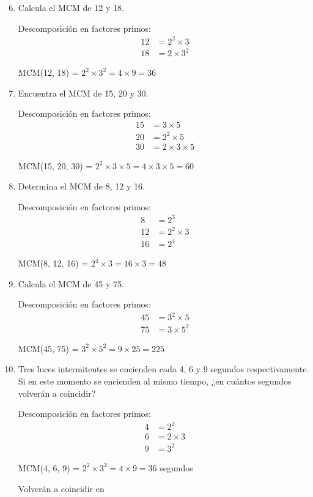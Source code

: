 \documentclass[12pt,a4paper]{article}
\begin{document}
\begin{enumerate}
    \setcounter{enumi}{5}
    \item Calcula el MCM de 12 y 18.

Descomposición en factores primos:
\begin{align*}
12 &= 2^2 \times 3 \\
18 &= 2 \times 3^2
\end{align*}

MCM(12, 18) = $2^2 \times 3^2 = 4 \times 9 = \boxed{36}$
    
    \item Encuentra el MCM de 15, 20 y 30.

Descomposición en factores primos:
\begin{align*}
15 &= 3 \times 5 \\
20 &= 2^2 \times 5 \\
30 &= 2 \times 3 \times 5
\end{align*}

MCM(15, 20, 30) = $2^2 \times 3 \times 5 = 4 \times 3 \times 5 = \boxed{60}$
    
    \item Determina el MCM de 8, 12 y 16.

Descomposición en factores primos:
\begin{align*}
8 &= 2^3 \\
12 &= 2^2 \times 3 \\
16 &= 2^4
\end{align*}

MCM(8, 12, 16) = $2^4 \times 3 = 16 \times 3 = \boxed{48}$
    
    \item Calcula el MCM de 45 y 75.

Descomposición en factores primos:
\begin{align*}
45 &= 3^2 \times 5 \\
75 &= 3 \times 5^2
\end{align*}

MCM(45, 75) = $3^2 \times 5^2 = 9 \times 25 = \boxed{225}$
    
    \item Tres luces intermitentes se encienden cada 4, 6 y 9 segundos respectivamente. Si en este momento se encienden al mismo tiempo, ¿en cuántos segundos volverán a coincidir?

Descomposición en factores primos:
\begin{align*}
4 &= 2^2 \\
6 &= 2 \times 3 \\
9 &= 3^2
\end{align*}

MCM(4, 6, 9) = $2^2 \times 3^2 = 4 \times 9 = 36$ segundos

Volverán a coincidir en 
\end{enumerate}
\end{document}
